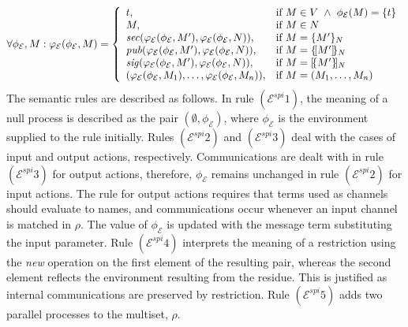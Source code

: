 \documentclass[10pt,a4paper,final,oneside,fleqn]{book}
\begin{document}
\[\forall\phi_\mathcal{E},M:\varphi_\mathcal{E}(\phi_\mathcal{E},M)=\left\{\begin{array}{ll}t,&\mbox{if }M\in V~\wedge~\phi_\mathcal{E}(M)=\{t\}\\
M,&\mbox{if }M\in N\\
\mbox{{\itshape sec\/}}(\varphi_\mathcal{E}(\phi_\mathcal{E},M'),\varphi_\mathcal{E}(\phi_\mathcal{E},N)),&\mbox{if }M=\{M'\}_{N}\\
\mbox{{\itshape pub\/}}(\varphi_\mathcal{E}(\phi_\mathcal{E},M'),\varphi_\mathcal{E}(\phi_\mathcal{E},N)),&\mbox{if }M=\{\![M']\!\}_{N}\\
\mbox{{\itshape sig\/}}(\varphi_\mathcal{E}(\phi_\mathcal{E},M'),\varphi_\mathcal{E}(\phi_\mathcal{E},N)),&\mbox{if }M=[\!\{M'\}\!]_{N}\\
(\varphi_\mathcal{E}(\phi_\mathcal{E},M_1),\ldots,\varphi_\mathcal{E}(\phi_\mathcal{E},M_n)),&\mbox{if }M=(M_1,\ldots,M_n)\\
\end{array}\right.\]
The semantic rules are described as follows.  In rule $(\mathcal{E}^{spi}1)$, the meaning of a null process is described as the pair $(\emptyset,\phi_\mathcal{E})$, where $\phi_\mathcal{E}$ is the environment supplied to the rule initially.  Rules $(\mathcal{E}^{spi}2)$ and $(\mathcal{E}^{spi}3)$ deal with the cases of input and output actions, respectively. Communications are dealt with in rule $(\mathcal{E}^{spi}3)$ for output actions, therefore, $\phi_\mathcal{E}$ remains unchanged in rule $(\mathcal{E}^{spi}2)$ for input actions.  The rule for output actions requires that terms used as channels should evaluate to names, and communications occur whenever an input channel is matched in $\rho$.  The value of $\phi_\mathcal{E}$ is updated with the message term substituting the input parameter.  Rule $(\mathcal{E}^{spi}4)$ interprets the meaning of a restriction using the {\itshape new\/} operation on the first element of the resulting pair, whereas the second element reflects the environment resulting from the residue.  This is justified as internal communications are preserved by restriction. Rule $(\mathcal{E}^{spi}5)$ adds two parallel processes to the multiset, $\rho$.
\end{document}
